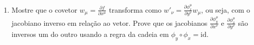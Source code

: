 \begin{enumerate}
\begin{enumerate}
                  \item Mostre que o covetor $w_\mu = \frac{\partial f}{\partial
                                    x^\mu}$ transforma como
                        $w'_\nu = \frac{\partial \phi_x^\mu}{\partial y^\nu}w_\mu$,
                        ou seja, com o jacobiano inverso em relação ao vetor. Prove
                        que os jacobianos $\frac{\partial \phi_y^\mu}{\partial x^\nu}$
                        e $\frac{\partial \phi_x^\mu}{\partial y^\nu}$ são inversos um
                        do outro usando a regra da cadeia em
                        $\phi_y \circ \phi_x = \mathrm{id}$.
            \end{enumerate}

\end{enumerate}

